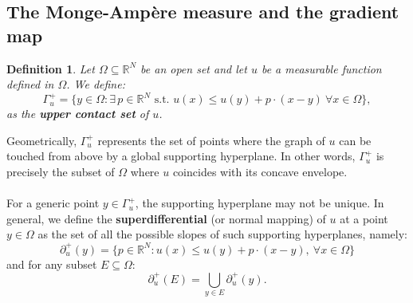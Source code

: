 \documentclass{article}
\newtheorem{definition}[theorem]{Definition}
\numberwithin{equation}{section}
\begin{document}
\subsection{The Monge-Ampère measure and the gradient map}
\begin{definition}
Let $\Omega \subseteq \mathbb{R}^N$ be an open set and let $u$ be a measurable function defined in $\Omega$. We define: 
\begin{equation}
    \Gamma^+_u = \{y \in \Omega : \exists \, p \in \mathbb{R}^N \text{ s.t. } u(x) \leq u(y) + p \cdot (x-y) \ \forall x \in \Omega\},
\end{equation}as the \textbf{upper contact set} of $u$. 

\end{definition}
\noindent Geometrically, $\Gamma^+_u$ represents the set of points where the graph of $u$ can be touched from above by a global supporting hyperplane. In other words, $\Gamma^+_u$ is precisely the subset of $\Omega$ where $u$ coincides with its concave envelope.
\\ \\
\noindent For a generic point $y \in \Gamma_u^+$, the supporting hyperplane may not be unique. In general, we define the \textbf{superdifferential} (or normal mapping) of $u$ at a point $y \in \Omega$ as the set of all the possible slopes of such supporting hyperplanes, namely: 
    \begin{equation}
    \partial^+_u(y)=\{p \in \mathbb{R}^N : u(x) \leq u(y) + p \cdot(x-y), \ \forall x \in \Omega\}
    \end{equation}
    and for any subset $E \subseteq \Omega$: 
    \begin{equation}
         \partial^+_u(E) = \bigcup_{y \in E}\partial^+_u(y).   
    \end{equation}
\end{document}
